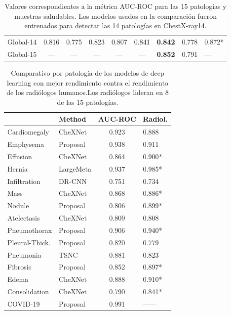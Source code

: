 \begin{table}[tb]
\begin{tabular}{|l||c|c|c|c|c|c|c|l|}
        \hline\hline
        Global-14	    &	0.816	&	0.775	&	0.823	&	0.807	&	0.841	&\bf{0.842}	& 0.778 &	0.872*	\\
        Global-15	    &	---	    &	---	    &	---	    &	---	    &	---	    &\bf{0.852}	& 0.791 &	---	    \\
        \hline
    \end{tabular}
    \caption{Valores correspondientes a la métrica AUC-ROC para las 15 patologías y muestras saludables.
             Los modelos usados en la comparación fueron entrenados para detectar las 14 patologías
             en ChestX-ray14.}
    \label{table_roc_auc}
\end{table}


\begin{table}[tb]
    \centering
    \begin{tabular}{|l||l|c|l|}
        \hline
                        &	Method	&	AUC-ROC	& Radiol.	\\
        \hline\hline
        Cardiomegaly	&	CheXNet	    & 0.923 &   0.888	\\
        Emphysema	    &	Proposal    & 0.938	&   0.911	\\
        Effusion	    &	CheXNet	    & 0.864 &   0.900*	\\
        Hernia	        &	LargeMeta   & 0.937	&   0.985*	\\
        Infiltration	&	DR-CNN	    & 0.751 &	0.734	\\
        Mass	        &	CheXNet	    & 0.868	&	0.886*	\\
        Nodule	        &	Proposal    & 0.806	&	0.899*	\\
        Atelectasis	    &	CheXNet	    & 0.809 &	0.808	\\
        Pneumothorax	&	Proposal    & 0.906 &	0.940*	\\
        Pleural-Thick.	&	Proposal    & 0.820	&	0.779	\\
        Pneumonia	    &	TSNC	    & 0.881 &	0.823	\\
        Fibrosis	    &	Proposal    & 0.852 &	0.897*	\\
        Edema	        &	CheXNet	    & 0.888 &	0.910*	\\
        Consolidation	&	CheXNet	    & 0.790 &	0.841*	\\
        COVID-19	    &	Proposal    & 0.991 &	------	\\
        \hline
    \end{tabular}
    \caption{Comparativo por patología de los modelos de deep learning con mejor rendimiento contra
             el rendimiento de los radiólogos humanos.Los radiólogos lideran en 8 de las 15
             patologías.}
    \label{table_dl_human}
\end{table}


